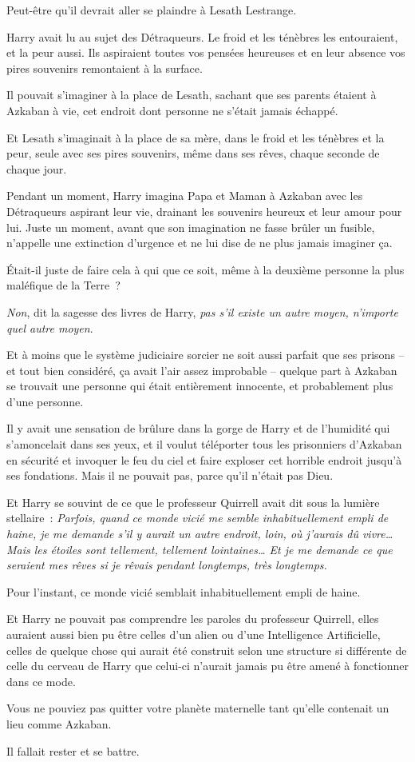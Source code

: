 Peut-être qu'il devrait aller se plaindre à Lesath Lestrange.

Harry avait lu au sujet des Détraqueurs. Le froid et les ténèbres les entouraient, et la peur aussi. Ils aspiraient toutes vos pensées heureuses et en leur absence vos pires souvenirs remontaient à la surface.

Il pouvait s'imaginer à la place de Lesath, sachant que ses parents étaient à Azkaban à vie, cet endroit dont personne ne s'était jamais échappé.

Et Lesath s'imaginait à la place de sa mère, dans le froid et les ténèbres et la peur, seule avec ses pires souvenirs, même dans ses rêves, chaque seconde de chaque jour.

Pendant un moment, Harry imagina Papa et Maman à Azkaban avec les Détraqueurs aspirant leur vie, drainant les souvenirs heureux et leur amour pour lui. Juste un moment, avant que son imagination ne fasse brûler un fusible, n'appelle une extinction d'urgence et ne lui dise de ne plus jamais imaginer ça.

Était-il juste de faire cela à qui que ce soit, même à la deuxième personne la plus maléfique de la Terre~?

\emph{Non}, dit la sagesse des livres de Harry, \emph{pas s'il existe un autre moyen, n'importe quel autre moyen}.

Et à moins que le système judiciaire sorcier ne soit aussi parfait que ses prisons -- et tout bien considéré, ça avait l'air assez improbable -- quelque part à Azkaban se trouvait une personne qui était entièrement innocente, et probablement plus d'une personne.

Il y avait une sensation de brûlure dans la gorge de Harry et de l'humidité qui s'amoncelait dans ses yeux, et il voulut téléporter tous les prisonniers d'Azkaban en sécurité et invoquer le feu du ciel et faire exploser cet horrible endroit jusqu'à ses fondations. Mais il ne pouvait pas, parce qu'il n'était pas Dieu.

Et Harry se souvint de ce que le professeur Quirrell avait dit sous la lumière stellaire~: \emph{Parfois, quand ce monde vicié me semble inhabituellement empli de haine, je me demande s'il y aurait un autre endroit, loin, où j'aurais dû vivre… Mais les étoiles sont tellement, tellement lointaines… Et je me demande ce que seraient mes rêves si je rêvais pendant longtemps, très longtemps.}

Pour l'instant, ce monde vicié semblait inhabituellement empli de haine.

Et Harry ne pouvait pas comprendre les paroles du professeur Quirrell, elles auraient aussi bien pu être celles d'un alien ou d'une Intelligence Artificielle, celles de quelque chose qui aurait été construit selon une structure si différente de celle du cerveau de Harry que celui-ci n'aurait jamais pu être amené à fonctionner dans ce mode.

Vous ne pouviez pas quitter votre planète maternelle tant qu'elle contenait un lieu comme Azkaban.

Il fallait rester et se battre.
